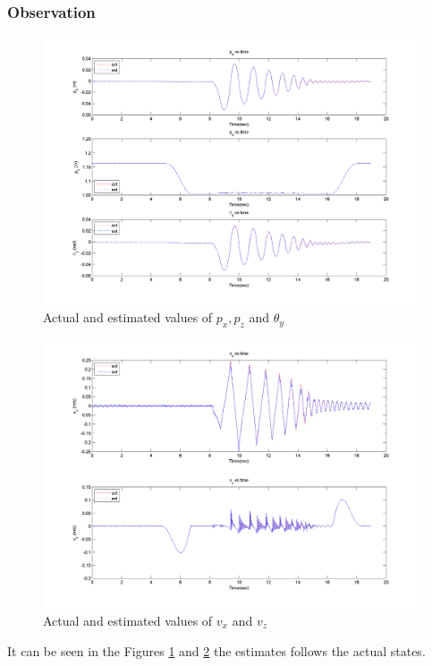 \subsubsection{Observation}
\begin{figure}
    \centering
    \includegraphics[trim=20mm 10mm 25mm 10mm,clip,scale=0.55]{Bilder/plots/simple_model/pos.png}
    \caption{Actual and estimated values of $p_x,p_z$ and $\theta_y$}
    \label{fig:simp_plotpos}
\end{figure}
\begin{figure}
    \centering
    \includegraphics[trim=20mm 10mm 25mm 10mm,clip,scale=0.55]{Bilder/plots/simple_model/vel.png}
    \caption{Actual and estimated values of $v_x$ and $v_z$}
    \label{fig:simp_plotvel}
\end{figure}
It can be seen in the Figures \ref{fig:simp_plotpos} and \ref{fig:simp_plotvel} the estimates follows the actual states. 
